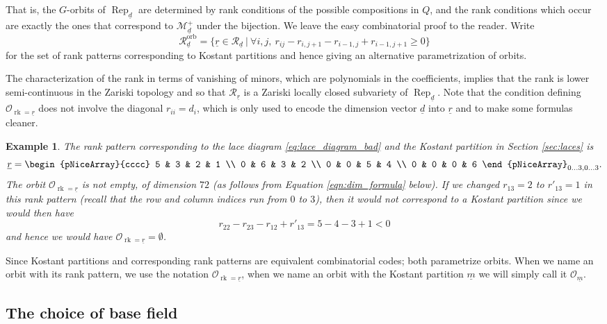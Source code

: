 \documentclass[a4paper]{amsart}
\DeclareMathOperator{\rk}{rk}
\DeclareMathOperator{\Rep}{\mathrm{Rep}}
\newcommand{\CO}{\mathcal{O}}
\newcommand{\CR}{\mathcal{R}}
\newcommand{\CM}{\mathcal{M}}
\newcommand{\ur}{\underline{r}}
\newcommand{\um}{\underline{m}}
\newcommand{\ud}{\underline{d}}
\newcommand{\orb}{\mathrm{orb}}
\theoremstyle{plain}
\newtheorem{example}[thm]{Example}
\begin{document}
That is, the $G$-orbits of $\Rep_{\ud}$ are determined by rank conditions of the possible compositions in $Q$, and the rank conditions which occur are exactly the ones that correspond to $\CM_{\ud}^+$ under the bijection. We leave the easy combinatorial proof to the reader. Write
\[
\CR^{\orb}_{\ud}=\{\ur\in \CR_{\ud}\ |\ \forall i,j,\ r_{ij}-r_{i,j+1}-r_{i-1,j}+r_{i-1,j+1}\geq 0\}
\]
for the set of rank patterns corresponding to Kostant partitions and hence giving an alternative parametrization of orbits.

The characterization of the rank in terms of vanishing of minors, which are polynomials in the coefficients, implies that the rank is lower semi-continuous in the Zariski topology and so that $\CR_{\ur}$ is a Zariski locally closed subvariety of $\Rep_{\ud}$. Note that the condition defining $\CO_{\rk=\ur}$ does not involve the diagonal $r_{ii}=d_i$, which is only used to encode the dimension vector $\ud$ into $\ur$ and to make some formulas cleaner.

\begin{example} \rm \label{Ex:first_example} 
The rank pattern corresponding to the lace diagram \eqref{eq:lace_diagram_bad} and the Kostant partition in Section \ref{sec:laces} is 
\[
\ur=
\begin{pNiceArray}{cccc}
    5 & 3 & 2 & 1 \\
    0 & 6 & 3 & 2 \\
    0 & 0 & 5 & 4 \\
    0 & 0 & 0 & 6
\end{pNiceArray}_{0\ldots 3, 0\ldots 3}.
\]
The orbit $\CO_{\rk=\ur}$ is not empty, of dimension $72$ (as follows from Equation \ref{eqn:dim_formula} below). If we changed $r_{13}=2$ to $r'_{13}=1$ in this rank pattern (recall that the row and column indices run from $0$ to $3$), then it would not correspond to a Kostant partition since we would then have
\[
r_{22}-r_{23}-r_{12}+r'_{13}=5-4-3+1<0
\]
and hence we would have $\CO_{\rk=\ur}=\emptyset$.
\end{example}

\medskip

 Since Kostant partitions and corresponding rank patterns are equivalent combinatorial codes; both parametrize orbits. When we name an orbit with its rank pattern, we use the notation $\CO_{\rk=\ur}$, when we name an orbit with the Kostant partition $\um$ we will simply call it $\CO_{\um}$.

\subsection{The choice of base field}\label{sec:choice_k}
\end{document}

